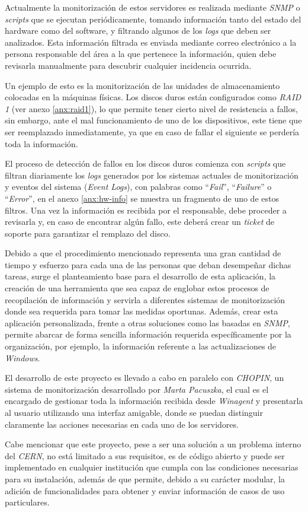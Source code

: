 Actualmente la monitorización de estos servidores es realizada mediante \textit{SNMP} o \textit{scripts} que se ejecutan periódicamente, tomando información tanto del estado del hardware como del software, y filtrando algunos de los \textit{logs} que deben ser analizados. Esta información filtrada es enviada mediante correo electrónico a la persona responsable del área a la que pertenece la información, quien debe revisarla manualmente para descubrir cualquier incidencia ocurrida.

Un ejemplo de esto es la monitorización de las unidades de almacenamiento colocadas en la máquinas físicas. Los discos duros están configurados como \textit{RAID 1} (ver anexo \ref{anx:raid1}), lo que permite tener cierto nivel de resistencia a fallos, sin embargo, ante el mal funcionamiento de uno de los dispositivos, este tiene que ser reemplazado inmediatamente, ya que en caso de fallar el siguiente se perdería toda la información.

El proceso de detección de fallos en los discos duros comienza con \textit{scripts} que filtran diariamente los \textit{logs} generados por los sistemas actuales de monitorización y eventos del sistema (\textit{Event Logs}), con palabras como ``\textit{Fail}'', ``\textit{Failure}'' o ``\textit{Error}'', en el anexo \ref{anx:hw-info} se muestra un fragmento de uno de estos filtros. Una vez la información es recibida por el responsable, debe proceder a revisarla y, en caso de encontrar algún fallo, este deberá crear un \textit{ticket} de soporte para garantizar el remplazo del disco.

Debido a que el procedimiento mencionado representa una gran cantidad de tiempo y esfuerzo para cada una de las personas que deban desempeñar dichas tareas, surge el planteamiento base para el desarrollo de esta aplicación, la creación de una herramienta que sea capaz de englobar estos procesos de recopilación de información y servirla a diferentes sistemas de monitorización donde sea requerida para tomar las medidas oportunas. Además, crear esta aplicación personalizada, frente a otras soluciones como las basadas en \textit{SNMP}, permite abarcar de forma sencilla información requerida específicamente por la organización, por ejemplo, la información referente a las actualizaciones de \textit{Windows}.

El desarrollo de este proyecto es llevado a cabo en paralelo con \textit{CHOPIN}, un sistema de monitorización desarrollado por \textit{Marta Pacuszka}, el cual es el encargado de gestionar toda la información recibida desde \textit{Winagent} y presentarla al usuario utilizando una interfaz amigable, donde se puedan distinguir claramente las acciones necesarias en cada uno de los servidores.

Cabe mencionar que este proyecto, pese a ser una solución a un problema interno del \textit{CERN}, no está limitado a sus requisitos, es de código abierto y puede ser implementado en cualquier institución que cumpla con las condiciones necesarias para su instalación, además de que permite, debido a su carácter modular, la adición de funcionalidades para obtener y enviar información de casos de uso particulares.
